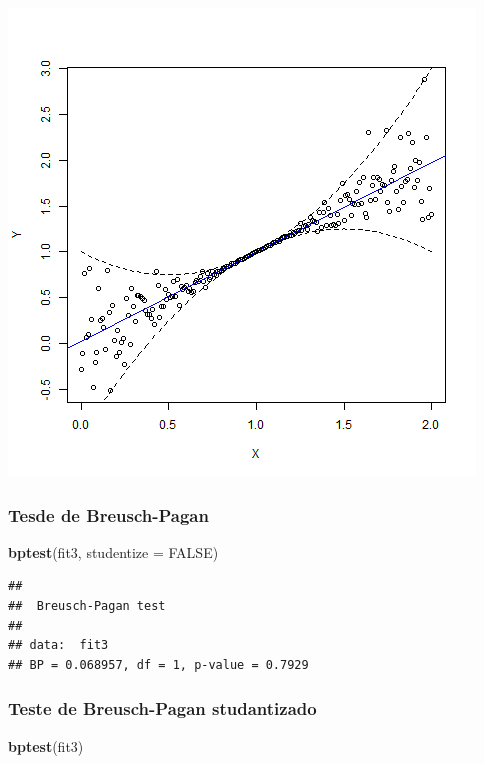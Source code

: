 \documentclass[a4paper, 12pt]{article}
\newenvironment{Shaded}{\begin{snugshade}}{\end{snugshade}}
\newcommand{\DataTypeTok}[1]{\textcolor[rgb]{0.13,0.29,0.53}{#1}}
\newcommand{\KeywordTok}[1]{\textcolor[rgb]{0.13,0.29,0.53}{\textbf{#1}}}
\newcommand{\NormalTok}[1]{#1}
\newcommand{\OtherTok}[1]{\textcolor[rgb]{0.56,0.35,0.01}{#1}}
\begin{document}
\begin{center}\includegraphics[width=0.9\linewidth]{images/hetero3-1} \end{center}

\hypertarget{tesde-de-breusch-pagan-2}{%
\subsubsection{Tesde de Breusch-Pagan}\label{tesde-de-breusch-pagan-2}}

\begin{Shaded}
\begin{Highlighting}[]
\KeywordTok{bptest}\NormalTok{(fit3, }\DataTypeTok{studentize =} \OtherTok{FALSE}\NormalTok{)}
\end{Highlighting}
\end{Shaded}

\begin{verbatim}
## 
##  Breusch-Pagan test
## 
## data:  fit3
## BP = 0.068957, df = 1, p-value = 0.7929
\end{verbatim}

\hypertarget{teste-de-breusch-pagan-studantizado-1}{%
\subsubsection{Teste de Breusch-Pagan
studantizado}\label{teste-de-breusch-pagan-studantizado-1}}

\begin{Shaded}
\begin{Highlighting}[]
\KeywordTok{bptest}\NormalTok{(fit3)}
\end{Highlighting}
\end{Shaded}
\end{document}
